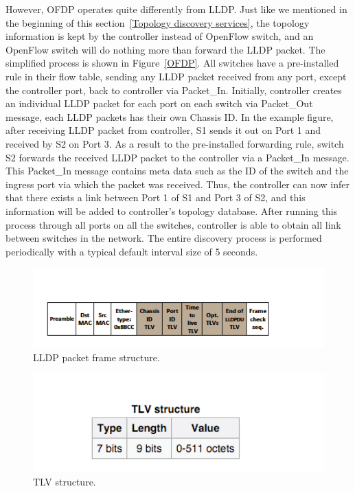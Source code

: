 However, OFDP operates quite differently from LLDP. Just like we mentioned in the beginning of this section~\ref{Topology discovery services}, the topology information is kept by the controller instead of OpenFlow switch, and an OpenFlow switch will do nothing more than forward the LLDP packet. The simplified process is shown in Figure~\ref{OFDP}. All switches have a pre-installed rule in their flow table, sending any LLDP packet received from any port, except the controller port, back to controller via Packet\_In. Initially, controller creates an individual LLDP packet for each port on each switch via Packet\_Out message, each LLDP packets has their own Chassis ID. In the example figure, after receiving LLDP packet from controller, S1 sends it out on Port 1 and received by S2 on Port 3. As a result to the pre-installed forwarding rule, switch S2 forwards the received LLDP packet to the controller via a Packet\_In message. This Packet\_In message contains meta data such as the ID of the switch and the ingress port via which the packet was received. Thus, the controller can now infer that there exists a link between Port 1 of S1 and Port 3 of S2, and this information will be added to controller's topology database. After running this process through all ports on all the switches, controller is able to obtain all link between switches in the network. The entire discovery process is performed periodically with a typical default interval size of 5 seconds. \cite{PPTI14}

\begin{figure}[H]
\begin{center} 
\includegraphics[width=1\textwidth]{figures/LLDP_packet_format.png}
\end{center}
\caption{LLDP packet frame structure. \cite{LLDP_WS}}
\label{LLDP_frame}
\end{figure}

\begin{figure}[H]
\begin{center} 
\includegraphics[width=1\textwidth]{figures/TLV_structure.png}
\end{center}
\caption{TLV structure. \cite{LLDP_WS}}
\label{TLV}
\end{figure}

